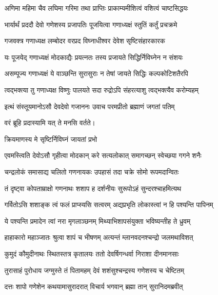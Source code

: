 \twolineshloka
{अणिमा महिमा चैव लघिमा गरिमा तथा}
{प्राप्तिः प्राकाम्यमीशित्वं वशित्वं चाष्टसिद्धयः}%

\twolineshloka
{भार्यार्थं प्रददौ देवो गणेशस्य प्रजापतिः}
{पूजयित्वा गणाध्यक्षं स्तुतिं कर्तुं प्रचक्रमे}%


\twolineshloka
{गजवक्त्र गणाध्यक्ष लम्बोदर वरप्रद}
{विघ्नाधीश्वर देवेश सृष्टिसंहारकारक}%

\twolineshloka
{यः पूजयेद् गणाध्यक्षं मोदकाद्यैः प्रयत्नतः}
{तस्य प्रजायते सिद्धिर्निविघ्नेन न संशयः}%

\twolineshloka
{असम्पूज्य गणाध्यक्षं ये वाञ्छन्ति सुरासुराः}
{न तेषां जायते सिद्धिः कल्पकोटिशतैरपि}%

\twolineshloka
{त्वद्भक्त्या तु गणाध्यक्ष विष्णुः पालयते सदा}
{रुद्रोऽपि संहरत्याशु त्वद्भक्त्यैव करोम्यहम्}%

\twolineshloka
{इत्थं संस्तूयमानोऽसौ देवदेवो गजाननः}
{उवाच परमप्रीतो ब्रह्माणं जगतां पतिम्}%


{वरं ब्रूहि प्रदास्यामि यत् ते मनसि वर्तते।}

\onelineshloka
{क्रियमाणस्य मे सृष्टिर्निविघ्नं जायतां प्रभो}%

\twolineshloka
{एवमस्त्विति देवोऽसौ गृहीत्वा मोदकान् करे}
{सत्यलोकात् समागच्छन् स्वेच्छया गगने शनैः}%

\twolineshloka
{चन्द्रलोकं समासाद्य चलितो गणनायकः}
{उपहासं तदा चक्रे सोमो रूपमदान्वितः}%

\twolineshloka
{तं दृष्ट्वा कोपताम्राक्षो गणनाथः शशाप ह}
{दर्शनीयः सुरूपोऽहं सुन्दरश्चाहमित्यथ}%

\twolineshloka
{गर्वितोऽसि शशाङ्क त्वं फलं प्राप्स्यसि सत्वरम्}
{अद्यप्रभृति लोकास्त्वां न हि पश्यन्ति पापिनम्}%

\twolineshloka
{ये पश्यन्ति प्रमादेन त्वां नरा मृगलाञ्छनम्}
{मिथ्याभिशापसंयुक्ता भविष्यन्तीह ते ध्रुवम्}%

\twolineshloka
{हाहाकारो महाञ्जातः श्रुत्वा शापं च भीषणम्}
{अत्यन्तं म्लानवदनश्चन्द्रो जलमथाविशत्}%

\twolineshloka
{कुमुदं कौमुदीनाथः स्थितस्तत्र कृतालयः}
{ततो देवर्षिगन्धर्वा निराशा दीनमानसाः}%

\twolineshloka
{तुरासाहं पुरोधाय जग्मुस्ते तं पितामहम्}
{देवं शशंसुश्चन्द्रस्य गणेशस्य च चेष्टितम्}%

\twolineshloka
{दत्तः शापो गणेशेन कथयामासुरादरात्}
{विचार्य भगवान् ब्रह्मा तान् सुरानिदमब्रवीत्}%

